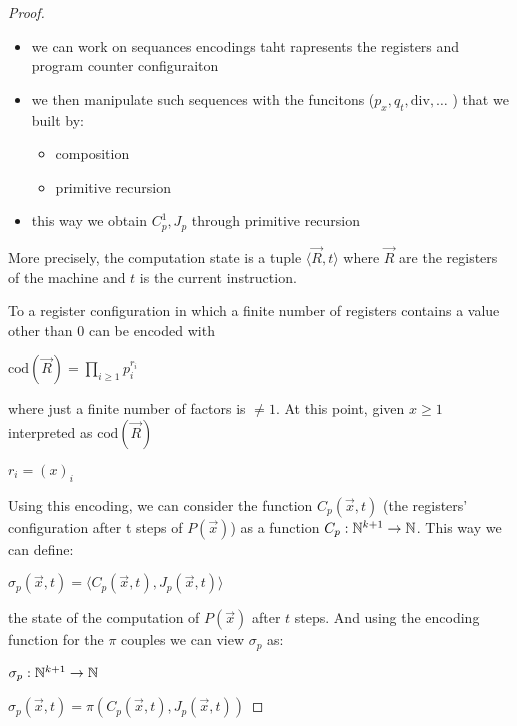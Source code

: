 \begin{theorem}[$\mathcal{R} = \mathcal{C}$]
\begin{proof}
    \begin{itemize}
    \item we can work on sequances encodings taht rapresents the registers and program counter configuraiton
    \item we then manipulate such sequences  with the funcitons (\( p_x, q_t, \text{div}, \dots \) ) that we built by:
      \begin{itemize}
      \item composition
      \item primitive recursion
      \end{itemize}
    \item this way we obtain $C_p^1, J_p$ through primitive recursion
    \end{itemize}
    More precisely, the computation state is a tuple
    $\langle \vec{R}, t \rangle$ where $\vec{R}$ are the registers of the
    machine and $t$ is the current instruction.

    To a register configuration in which a finite number of registers
    contains a value other than 0 can be encoded with

    \begin{center}
      $\text{cod}(\vec{R}) = \prod\limits_{i \geq 1}p_i^{r_i}$
    \end{center}

    where just a finite number of factors is $\neq 1$. At this point,
    given $x \geq 1$ interpreted as $\text{cod}(\vec{R})$

    \begin{center}
      $r_i = (x)_i$
    \end{center}

    Using this encoding, we can consider the function $C_p(\vec{x},t)$
    (the registers' configuration after t steps of $P(\vec{x})$) as a
    function $C_p : \mathbb{N}^{k+1} \rightarrow \mathbb{N}$. This way we can define:

    \begin{center}
      $\sigma_p(\vec{x},t) = \langle C_p(\vec{x},t), J_p(\vec{x},t) \rangle$
    \end{center}

    the state of the computation of $P(\vec{x})$ after $t$ steps. And
    using the encoding function for the $\pi$ couples we can view
    $\sigma_p$ as:

    $\sigma_p : \mathbb{N}^{k+1} \rightarrow \mathbb{N}$

    $\sigma_p(\vec{x}, t) = \pi(C_p(\vec{x},t), J_p(\vec{x},t))$


\end{proof}
\end{theorem}

